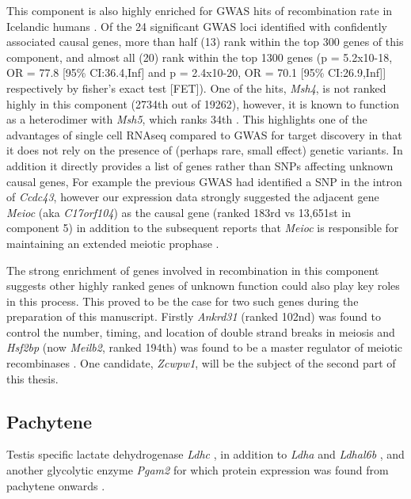 This component is also highly enriched for GWAS hits of recombination rate in Icelandic humans \cite{Halldorsson2019Characterizing}. Of the 24 significant GWAS loci identified with confidently associated causal genes, more than half (13) rank within the top 300 genes of this component, and almost all (20) rank within the top 1300 genes (p = 5.2x10-18, OR = 77.8 [95\% CI:36.4,Inf] and p = 2.4x10-20, OR = 70.1 [95\% CI:26.9,Inf]] respectively by fisher's exact test [FET]). One of the hits, \textit{Msh4}, is not ranked highly in this component (2734th out of 19262), however, it is known to function as a heterodimer with \textit{Msh5}, which ranks 34th \cite{Rakshambikai2013Structural}. This highlights one of the advantages of single cell RNAseq compared to GWAS for target discovery in that it does not rely on the presence of (perhaps rare, small effect) genetic variants. In addition it directly provides a list of genes rather than SNPs affecting unknown causal genes, For example the previous GWAS had identified a SNP in the intron of \textit{Ccdc43}, however our expression data strongly suggested the adjacent gene \textit{Meioc} (aka \textit{C17orf104}) as the causal gene (ranked 183rd vs 13,651st in component 5) in addition to the subsequent reports that \textit{Meioc} is responsible for maintaining an extended meiotic prophase \cite{Abby2016Implementation, Kong2014Common, Soh2017Meioc}. 

The strong enrichment of genes involved in recombination in this component suggests other highly ranked genes of unknown function could also play key roles in this process. This proved to be the case for two such genes during the preparation of this manuscript. Firstly \textit{Ankrd31} (ranked 102nd) was found to control the number, timing, and location of double strand breaks in meiosis \cite{Boekhout2018REC114, Papanikos2018ANKRD31} and \textit{Hsf2bp} (now \textit{Meilb2}, ranked 194th) was found to be a master regulator of meiotic recombinases \cite{Zhang2019meiosisspecific}. One candidate, \textit{Zcwpw1}, will be the subject of the second part of this thesis.


\subsection{Pachytene}

Testis specific lactate dehydrogenase \textit{Ldhc} \parencite{Goldberg1963Lactic, Blanco1963Lactate, Goldberg2010LDHC}, in addition to \textit{Ldha} and \textit{Ldhal6b} \parencite{Wang2005Cloning}, and another glycolytic enzyme \textit{Pgam2} for which protein expression was found from pachytene onwards \parencite{Fundele1987Developmental}.

